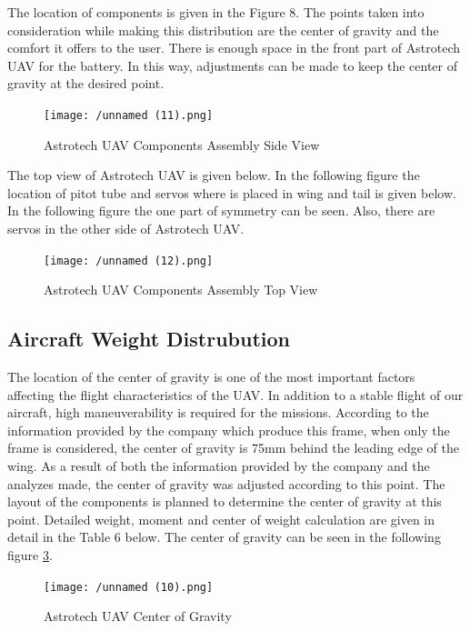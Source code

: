 \documentclass[12pt]{article}
\begin{document}
\FloatBarrier
\justify
The location of components is given in the Figure 8. The points taken into consideration while making this distribution are the center of gravity and the comfort it offers to the user. There is enough space in the front part of Astrotech UAV for the battery. In this way, adjustments can be made to keep the center of gravity at the desired point.

\begin{figure}[ht]
 	\centering
 	\texttt{[image: /unnamed (11).png]}
 	\caption{Astrotech UAV Components Assembly Side View}
        \label{fig:assembly_side}
 \end{figure}
\FloatBarrier
\justify
The top view of Astrotech UAV is given below. In the following figure the location of pitot tube and servos where is placed in wing and tail is given below. In the following figure the one part of symmetry can be seen. Also, there are servos in the other side of Astrotech UAV.

\begin{figure}[ht]
 	\centering
 	\texttt{[image: /unnamed (12).png]}
 	\caption{Astrotech UAV Components Assembly Top View}
        \label{fig:assembly_top}
 \end{figure}
\FloatBarrier



\subsection{Aircraft Weight Distrubution}

The location of the center of gravity is one of the most important factors affecting the flight characteristics of the UAV. In addition to a stable flight of our aircraft, high maneuverability is required for the missions. According to the information provided by the company which produce this frame, when only the frame is considered, the center of gravity is 75mm behind the leading edge of the wing. As a result of both the information provided by the company and the analyzes made, the center of gravity was adjusted according to this point. The layout of the components is planned to determine the center of gravity at this point. Detailed weight, moment and center of weight calculation are given in detail in the Table 6 below. The center of gravity can be seen in the following figure \ref{fig:CG}.

\begin{figure}[ht]
 	\centering
 	\texttt{[image: /unnamed (10).png]}
 	\caption{Astrotech UAV Center of Gravity}
        \label{fig:CG}
 \end{figure}
\FloatBarrier
\end{document}
